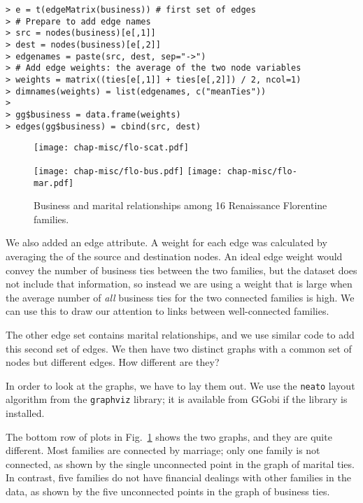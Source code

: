\begin{verbatim}
> e = t(edgeMatrix(business)) # first set of edges
> # Prepare to add edge names
> src = nodes(business)[e[,1]]
> dest = nodes(business)[e[,2]]
> edgenames = paste(src, dest, sep="->")
> # Add edge weights: the average of the two node variables
> weights = matrix((ties[e[,1]] + ties[e[,2]]) / 2, ncol=1)
> dimnames(weights) = list(edgenames, c("meanTies"))
>
> gg$business = data.frame(weights)
> edges(gg$business) = cbind(src, dest)
\end{verbatim}

\begin{figure}[htbp]
\centerline{
  \texttt{[image: chap-misc/flo-scat.pdf]} }
\centerline{
  \texttt{[image: chap-misc/flo-bus.pdf]}
  \texttt{[image: chap-misc/flo-mar.pdf]}
}
\caption[Business and marital relationships among Renaissance
Florentine families]{Business and marital relationships among 16
Renaissance Florentine families.}
\label{florentine1}
\end{figure}

\noindent
We also added an edge attribute.  A weight for each edge was
calculated by averaging the  of the source and
destination nodes.  An ideal edge weight would convey the number of
business ties between the two families, but the dataset does not
include that information, so instead we are using a weight that is
large when the average number of {\em all} business ties for the two
connected families is high.  We can use this to draw our attention to
links between well-connected families.

The other edge set contains marital relationships, and we use similar
code to add this second set of edges.  We then have two distinct
graphs with a common set of nodes but different edges.  How different
are they?

In order to look at the graphs, we have to lay them out.  We use the
{\tt neato} layout algorithm from the {\tt graphviz}\cite{GanNor00}
library; it is available from GGobi if the library is installed.

The bottom row of plots in Fig.~\ref{florentine1} shows the two
graphs, and they are quite different.  Most families are connected by
marriage; only one family is not connected, as shown by the single
unconnected point in the graph of marital ties.  In contrast, five
families do not have financial dealings with other families in the
data, as shown by the five unconnected points in the graph of
business ties.


